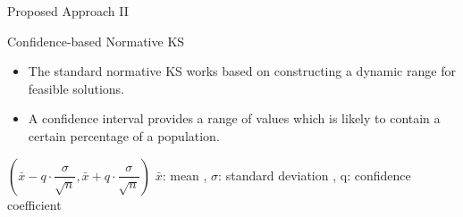 \documentclass[table]{beamer}
\begin{document}

	\begin{frame}{Proposed Approach II}
		\begin{block}{Confidence-based Normative KS}
			\begin{itemize}
				\item The standard normative KS works based on constructing a dynamic range for feasible solutions.
				\newline \item A confidence interval provides a range of values which is likely to contain a certain percentage of a population.
			\end{itemize}
		\end{block}
		\begin{block}{}
			\centering
			$(\bar{x}-q\cdot\dfrac{\sigma}{\sqrt{n}} , \bar{x}+q\cdot\dfrac{\sigma}{\sqrt{n}})$\newline
			$\bar{x}$: mean , $\sigma$: standard deviation , q: confidence coefficient
		\end{block}
	\end{frame}
\end{document}
